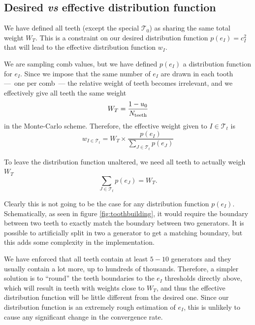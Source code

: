 \documentclass[./thesis.tex]{subfiles}
\begin{document}
\subsection{Desired \textit{vs} effective distribution function}
\label{sec:pt2_distribution}

We have defined all teeth (except the special $\mathcal{T}_0$) as sharing the same total weight $W_T$. This is a constraint on our desired distribution function $p(e_I) = c_I^2$ that will lead to the effective distribution function $w_I$.

We are sampling comb values, but we have defined $p(e_I)$ a distribution function for $e_I$. Since we impose that the same number of $e_I$ are drawn in each tooth ---~one per comb~--- the relative weight of teeth becomes irrelevant, and we effectively give all teeth the same weight 
\begin{equation}
W_T=\frac{1-u_0}{N_\text{teeth}}
\end{equation}
in the Monte-Carlo scheme. Therefore, the effective weight given to $I \in \mathcal{T}_t$ is
\begin{equation}
w_{I \in \mathcal{T}_t} = W_T \times \frac{p(e_I)}{\sum_{J \in \mathcal{T}_t} p(e_J)}
\end{equation}

To leave the distribution function unaltered, we need all teeth to actually weigh $W_T$
\begin{equation}
\sum_{J \in \mathcal{T}_t} p(e_J) = W_T.
\end{equation}

Clearly this is not going to be the case for any distribution function $p(e_I)$. Schematically, as seen in figure \ref{fig:toothbuilding}, it would require the boundary between two teeth to exactly match the boundary between two generators. It is possible to artificially split in two a generator to get a matching boundary, but this adds some complexity in the implementation.

We have enforced that all teeth contain at least $5-10$ generators and they usually contain a lot more, up to hundreds of thousands. Therefore, a simpler solution is to ``round'' the teeth boundaries to the $e_I$ thresholds directly above, which will result in teeth with weights close to $W_T$, and thus the effective distribution function will be little different from the desired one. Since our distribution function is an extremely rough estimation of $e_I$, this is unlikely to cause any significant change in the convergence rate.
\end{document}
